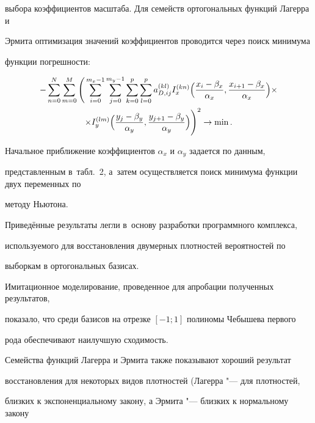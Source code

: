 выбора коэффициентов масштаба. Для семейств ортогональных функций Лагерра и

Эрмита оптимизация значений коэффициентов проводится через поиск минимума

функции погрешности:

\begin{multline*}

-\sum\limits_{n=0}^N

 \sum\limits_{m=0}^M \Bigg(

\sum\limits_{i=0}^{m_x-1}

\sum\limits_{j=0}^{m_y-1}

\sum\limits_{k=0}^p

\sum\limits_{l=0}^p

a_{D, ij}^{(kl)} I_x^{(kn)} \Bigl( \frac{x_i -\beta _x }{\alpha _x }, \frac{x_{i+1} -\beta _x }{\alpha _x }\Bigr) \times \\ \times

I_y^{(lm)} \Bigl( \frac{y_j -\beta _y }{\alpha _y }, \frac{y_{j+1} -\beta _y }{\alpha _y } \Bigr)  \Biggr)^2 \to \min .

\end{multline*}



Начальное приближение коэффициентов $\alpha _x $ и $\alpha _y $ задается по данным,

представленным в~табл.~2, а~затем осуществляется поиск минимума функции двух переменных по

методу Ньютона.



Приведённые результаты легли в~основу разработки программного комплекса,

используемого для восстановления двумерных плотностей вероятностей по

выборкам в ортогональных базисах.

Имитационное моделирование, проведенное для апробации полученных результатов,

показало, что среди базисов на отрезке $[ -1; 1]$ полиномы Чебышева первого

рода обеспечивают наилучшую сходимость.

Семейства функций Лагерра и Эрмита также показывают хороший результат

восстановления для некоторых видов плотностей (Лагерра "--- для плотностей,

близких к экспоненциальному закону, а Эрмита "--- близких к нормальному закону

